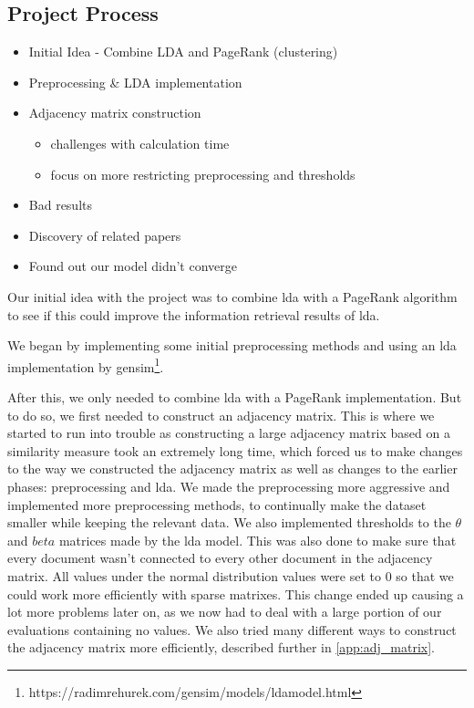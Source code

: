 \subsection{Project Process}
\begin{itemize}
	\item Initial Idea - Combine LDA and PageRank (clustering)
	\item Preprocessing \& LDA implementation
	\item Adjacency matrix construction
	\begin{itemize}
		\item challenges with calculation time
		\item focus on more restricting preprocessing and thresholds
	\end{itemize}
	\item Bad results
	\item Discovery of related papers
	\item Found out our model didn't converge
\end{itemize}

Our initial idea with the project was to combine \gls{lda} with a PageRank algorithm to see if this could improve the information retrieval results of \gls{lda}.

We began by implementing some initial preprocessing methods and using an \gls{lda} implementation by gensim\footnote{https://radimrehurek.com/gensim/models/ldamodel.html}.

After this, we only needed to combine \gls{lda} with a PageRank implementation. 
But to do so, we first needed to construct an adjacency matrix. 
This is where we started to run into trouble as constructing a large adjacency matrix based on a similarity measure took an extremely long time, which forced us to make changes to the way we constructed the adjacency matrix as well as changes to the earlier phases: preprocessing and \gls{lda}.
We made the preprocessing more aggressive and implemented more preprocessing methods, to continually make the dataset smaller while keeping the relevant data.
We also implemented thresholds to the $\theta$ and $beta$ matrices made by the \gls{lda} model.
This was also done to make sure that every document wasn't connected to every other document in the adjacency matrix.
All values under the normal distribution values were set to 0 so that we could work more efficiently with sparse matrixes.
This change ended up causing a lot more problems later on, as we now had to deal with a large portion of our evaluations containing no values. 
We also tried many different ways to construct the adjacency matrix more efficiently, described further in \autoref{app:adj_matrix}.

